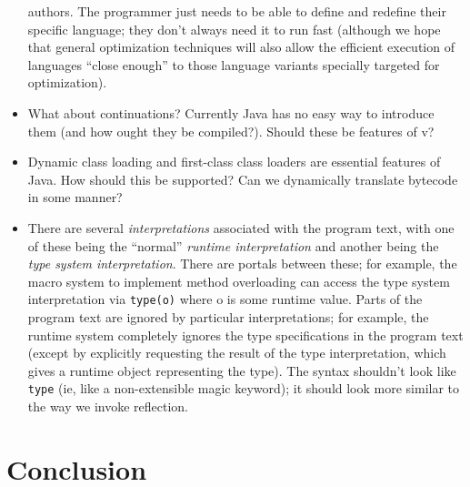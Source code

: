 \documentclass[11pt,notitlepage,twocolumn]{article}
\newcommand{\vlang}{\textsf{v}\xspace}
\begin{document}
\begin{itemize}
  authors.   The programmer just needs to be able to define and
  redefine their specific language; they don't always need it to run
  fast (although we hope that general optimization techniques will
  also allow the efficient execution of languages ``close enough'' to
  those language variants specially targeted for optimization).
\item What about continuations?  Currently Java has no easy way to
  introduce them (and how ought they be compiled?).  Should these be
  features of \vlang?
\item Dynamic class loading and first-class class loaders are
  essential features of Java.  How should this be supported?  Can we
  dynamically translate bytecode in some manner?
\item There are several \emph{interpretations} associated with the
  program text, with one of these being the ``normal'' \emph{runtime
  interpretation} and another being the \emph{type system
  interpretation}.  There are portals between these; for example, the
  macro system to implement method overloading can access the type
  system interpretation via \texttt{type(o)} where o is some runtime
  value.  Parts of the program text are ignored by particular
  interpretations; for example, the runtime system completely ignores
  the type specifications in the program text (except by explicitly
  requesting the result of the type interpretation, which gives
  a runtime object representing the type).  The syntax shouldn't look
  like \texttt{type} (ie, like a non-extensible magic keyword); it
  should look more similar to the way we invoke reflection.
\end{itemize}

\section{Conclusion}


\end{document}
